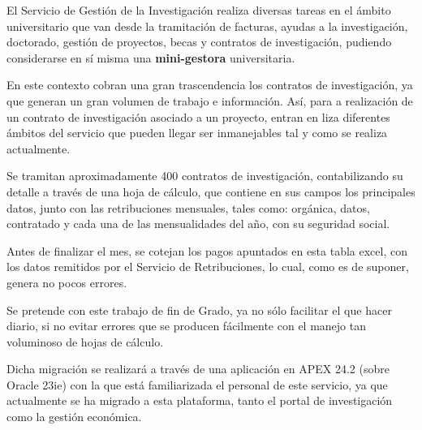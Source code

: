
El Servicio de Gestión de la Investigación realiza diversas tareas en el ámbito universitario que van desde la tramitación de facturas, ayudas a la investigación, doctorado, gestión de proyectos, becas y contratos de investigación, pudiendo considerarse en sí misma una \textbf{mini-gestora}   universitaria.

En este contexto cobran una gran trascendencia los contratos de investigación, ya que generan un gran volumen de trabajo e información. Así, para a realización de un contrato de investigación asociado a un proyecto, entran en liza diferentes ámbitos del servicio que pueden llegar ser inmanejables tal y como se realiza actualmente.

Se tramitan aproximadamente 400 contratos de investigación, contabilizando su detalle a través de una hoja de cálculo, que contiene en sus campos los principales datos, junto con las retribuciones mensuales, tales como: orgánica, datos, contratado y cada una de las mensualidades del año, con su seguridad social.

Antes de finalizar el mes, se cotejan los pagos apuntados en esta tabla excel, con los datos remitidos por el Servicio de Retribuciones, lo cual, como es de suponer, genera no pocos errores.

Se pretende con este trabajo de fin de Grado, ya no sólo facilitar el que hacer diario, si no evitar errores que se producen fácilmente con el manejo tan voluminoso de hojas de cálculo.

Dicha migración se realizará a través de una aplicación en \acrfull{APEX} 24.2 (sobre Oracle 23ie) con la que está familiarizada el personal de este servicio, ya que actualmente se ha migrado a esta plataforma, tanto el portal de investigación como la gestión económica.
